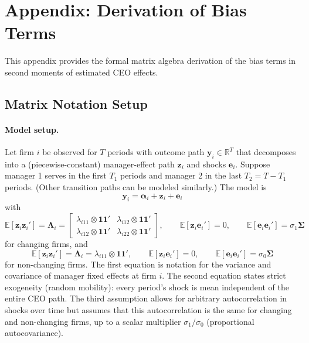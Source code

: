 \documentclass[11pt,a4paper]{article}
\begin{document}
\clearpage
\appendix
\renewcommand{\thefigure}{A\arabic{figure}}
\renewcommand{\thetable}{A\arabic{table}}
\setcounter{figure}{0}
\setcounter{table}{0}


\section{Appendix: Derivation of Bias Terms}
This appendix provides the formal matrix algebra derivation of the bias terms in second moments of estimated CEO effects.

\subsection{Matrix Notation Setup}

\paragraph{Model setup.} Let firm $i$ be observed for $T$ periods with outcome path $\mathbf y_i\in\mathbb R^T$ that decomposes into a (piecewise-constant) manager-effect path $\mathbf z_i$ and shocks $\mathbf e_i$. Suppose manager 1 serves in the first $T_1$ periods and manager 2 in the last $T_2=T-T_1$ periods. (Other transition paths can be modeled similarly.) The model is
\begin{equation}
\mathbf y_i = \mathbf \alpha_i + \mathbf z_i + \mathbf e_i
\end{equation}
with 
\begin{equation}
\mathbb E[\mathbf z_i\mathbf z_i']= \mathbf \Lambda_i=
\begin{bmatrix}
  \lambda_{i11}\otimes \mathbf{11}' & \lambda_{i12}\otimes \mathbf{11}'\\
  \lambda_{i12}\otimes \mathbf{11}' & \lambda_{i22}\otimes \mathbf{11}'
\end{bmatrix},
\qquad \mathbb E[\mathbf z_i\mathbf e_i']=0,
\qquad \mathbb E[\mathbf e_i\mathbf e_i']=\sigma_1\mathbf\Sigma
\end{equation}
for changing firms, and 
\begin{equation}
\mathbb E[\mathbf z_i\mathbf z_i']= \mathbf \Lambda_i=
  \lambda_{i11}\otimes \mathbf{11}',
\qquad \mathbb E[\mathbf z_i\mathbf e_i']=0,
\qquad \mathbb E[\mathbf e_i\mathbf e_i']=\sigma_0\mathbf\Sigma
\end{equation}
for non-changing firms. The first equation is notation for the variance and covariance of manager fixed effects at firm $i$. The second equation states strict exogeneity (random mobility): every period's shock is mean independent of the entire CEO path. The third assumption allows for arbitrary autocorrelation in shocks over time but assumes that this autocorrelation is the same for changing and non-changing firms, up to a scalar multiplier $\sigma_1/\sigma_0$ (proportional autocovariance).
\end{document}
